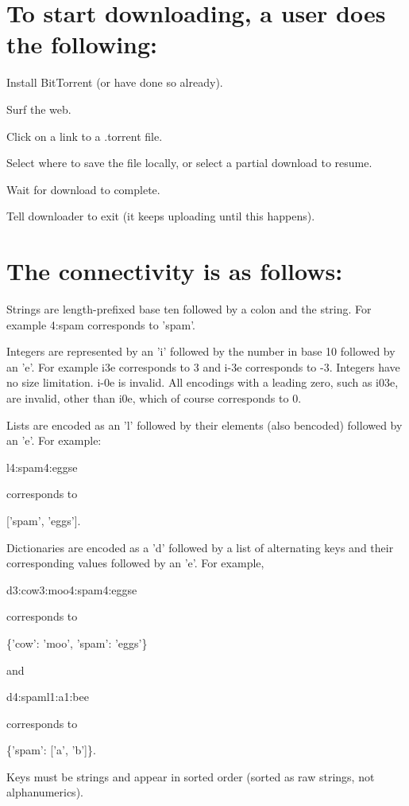 \documentclass{article}
\begin{document}
{\section{To start downloading, a user does the following:}}
{\begin{enumerate}
  {\item Install BitTorrent (or have done so already).}
  {\item Surf the web.}
  {\item Click on a link to a .torrent file.}
  {\item Select where to save the file locally, or select a partial download to resume.}
  {\item Wait for download to complete.}
  {\item Tell downloader to exit (it keeps uploading until this happens).}
\end{enumerate}}

{\section {The connectivity is as follows:}}
{\begin{itemize}
  {\item Strings are length-prefixed base ten followed by a colon and the string. For example 4:spam corresponds to 'spam'.}
  {\item Integers are represented by an 'i' followed by the number in base 10 followed by an 'e'. For example i3e corresponds to 3 and i-3e corresponds to -3. Integers have no size limitation. i-0e is invalid. All encodings with a leading zero, such as i03e, are invalid, other than i0e, which of course corresponds to 0.}
  {\item Lists are encoded as an 'l' followed by their elements (also bencoded) followed by an 'e'. For example:
    \begin{center}
      l4:spam4:eggse
    \end{center}
    corresponds to 
    \begin{center}
      ['spam', 'eggs'].
    \end{center}
  }
  {\item Dictionaries are encoded as a 'd' followed by a list of alternating keys and their corresponding values followed by an 'e'. For example, 
    \begin{center}
      d3:cow3:moo4:spam4:eggse
    \end{center}
    corresponds to 
    \begin{center}
      \{'cow': 'moo', 'spam': 'eggs'\}
    \end{center}
    and 
    \begin{center}
      d4:spaml1:a1:bee
    \end{center}
    corresponds to 
    \begin{center}
      \{'spam': ['a', 'b']\}.
    \end{center}
    Keys must be strings and appear in sorted order (sorted as raw strings, not alphanumerics).
  }
\end{itemize}}
\end{document}
